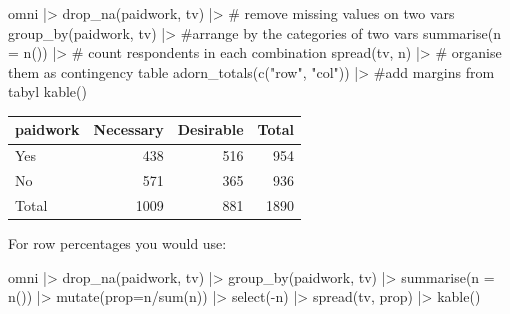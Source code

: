 \documentclass[
  letterpaper,
  DIV=11,
  numbers=noendperiod]{scrreprt}
\newenvironment{Shaded}{\begin{snugshade}}{\end{snugshade}}
\newcommand{\AttributeTok}[1]{\textcolor[rgb]{0.40,0.45,0.13}{#1}}
\newcommand{\CommentTok}[1]{\textcolor[rgb]{0.37,0.37,0.37}{#1}}
\newcommand{\FunctionTok}[1]{\textcolor[rgb]{0.28,0.35,0.67}{#1}}
\newcommand{\NormalTok}[1]{\textcolor[rgb]{0.00,0.23,0.31}{#1}}
\newcommand{\SpecialCharTok}[1]{\textcolor[rgb]{0.37,0.37,0.37}{#1}}
\newcommand{\StringTok}[1]{\textcolor[rgb]{0.13,0.47,0.30}{#1}}
\newcounter{none} %
\begin{document}
\begin{Shaded}
\begin{Highlighting}[]
\NormalTok{omni }\SpecialCharTok{|\textgreater{}} 
  \FunctionTok{drop\_na}\NormalTok{(paidwork, tv) }\SpecialCharTok{|\textgreater{}} \CommentTok{\# remove missing values on two vars}
  \FunctionTok{group\_by}\NormalTok{(paidwork, tv) }\SpecialCharTok{|\textgreater{}} \CommentTok{\#arrange by the categories of two vars}
  \FunctionTok{summarise}\NormalTok{(}\AttributeTok{n =} \FunctionTok{n}\NormalTok{()) }\SpecialCharTok{|\textgreater{}}  \CommentTok{\# count respondents in each combination}
  \FunctionTok{spread}\NormalTok{(tv, n) }\SpecialCharTok{|\textgreater{}} \CommentTok{\# organise them as contingency table}
  \FunctionTok{adorn\_totals}\NormalTok{(}\FunctionTok{c}\NormalTok{(}\StringTok{"row"}\NormalTok{, }\StringTok{"col"}\NormalTok{)) }\SpecialCharTok{|\textgreater{}} \CommentTok{\#add margins from tabyl}
  \FunctionTok{kable}\NormalTok{()}
\end{Highlighting}
\end{Shaded}

{\def\LTcaptype{none} %
\begin{longtable}[]{@{}lrrr@{}}
\toprule\noalign{}
paidwork & Necessary & Desirable & Total \\
\midrule\noalign{}
\endhead
\bottomrule\noalign{}
\endlastfoot
Yes & 438 & 516 & 954 \\
No & 571 & 365 & 936 \\
Total & 1009 & 881 & 1890 \\
\end{longtable}
}

For row percentages you would use:

\begin{Shaded}
\begin{Highlighting}[]
\NormalTok{omni }\SpecialCharTok{|\textgreater{}} 
  \FunctionTok{drop\_na}\NormalTok{(paidwork, tv) }\SpecialCharTok{|\textgreater{}} 
  \FunctionTok{group\_by}\NormalTok{(paidwork, tv) }\SpecialCharTok{|\textgreater{}}
  \FunctionTok{summarise}\NormalTok{(}\AttributeTok{n =} \FunctionTok{n}\NormalTok{()) }\SpecialCharTok{|\textgreater{}} 
  \FunctionTok{mutate}\NormalTok{(}\AttributeTok{prop=}\NormalTok{n}\SpecialCharTok{/}\FunctionTok{sum}\NormalTok{(n)) }\SpecialCharTok{|\textgreater{}} 
  \FunctionTok{select}\NormalTok{(}\SpecialCharTok{{-}}\NormalTok{n) }\SpecialCharTok{|\textgreater{}} 
  \FunctionTok{spread}\NormalTok{(tv, prop) }\SpecialCharTok{|\textgreater{}} 
  \FunctionTok{kable}\NormalTok{()}
\end{Highlighting}
\end{Shaded}
\end{document}
